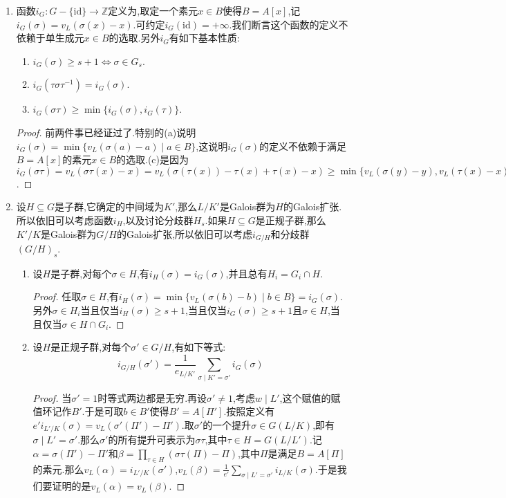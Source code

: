 \begin{enumerate}
\begin{proof}
    	验证当$s$足够大时有$G_s=\{e\}$.因为这里$L/K$是有限扩张,只要取$N=\max\{v_L(\sigma(x)-x)\}$,其中$\sigma\not=\mathrm{id}$,那么当$s\ge N$时就有每个$\sigma\not=\mathrm{id}$都不在$G_s$里.也即$G_s=\{e\}$.
    \end{proof}
    \item 函数$i_G:G-\{\mathrm{id}\}\to\mathbb{Z}$定义为,取定一个素元$x\in B$使得$B=A[x]$,记$i_G(\sigma)=v_L(\sigma(x)-x)$.可约定$i_G(\mathrm{id})=+\infty$.我们断言这个函数的定义不依赖于单生成元$x\in B$的选取.另外$i_G$有如下基本性质:
    \begin{enumerate}
    	\item $i_G(\sigma)\ge s+1\Leftrightarrow\sigma\in G_s$.
    	\item $i_G(\tau\sigma\tau^{-1})=i_G(\sigma)$.
    	\item $i_G(\sigma\tau)\ge\min\{i_G(\sigma),i_G(\tau)\}$.
    \end{enumerate}
    \begin{proof}
    	
    	前两件事已经证过了.特别的(a)说明$i_G(\sigma)=\min\{v_L(\sigma(a)-a)\mid a\in B\}$,这说明$i_G(\sigma)$的定义不依赖于满足$B=A[x]$的素元$x\in B$的选取.(c)是因为$i_G(\sigma\tau)=v_L(\sigma\tau(x)-x)=v_L(\sigma(\tau(x))-\tau(x)+\tau(x)-x)\ge\min\{v_L(\sigma(y)-y),v_L(\tau(x)-x)\}\ge\min\{i_G(\sigma),i_G(\tau)\}$.
    \end{proof}
    \item 设$H\subseteq G$是子群,它确定的中间域为$K'$,那么$L/K'$是Galois群为$H$的Galois扩张.所以依旧可以考虑函数$i_H$,以及讨论分歧群$H_s$.如果$H\subseteq G$是正规子群,那么$K'/K$是Galois群为$G/H$的Galois扩张,所以依旧可以考虑$i_{G/H}$和分歧群$(G/H)_s$.
    \begin{enumerate}
    	\item 设$H$是子群,对每个$\sigma\in H$,有$i_H(\sigma)=i_G(\sigma)$,并且总有$H_i=G_i\cap H$.
    	\begin{proof}
    		
    		任取$\sigma\in H$,有$i_H(\sigma)=\min\{v_L(\sigma(b)-b)\mid b\in B\}=i_G(\sigma)$.另外$\sigma\in H_i$当且仅当$i_H(\sigma)\ge s+1$,当且仅当$i_G(\sigma)\ge s+1$且$\sigma\in H$,当且仅当$\sigma\in H\cap G_i$.
    	\end{proof}
        \item 设$H$是正规子群,对每个$\sigma'\in G/H$,有如下等式:
        $$i_{G/H}(\sigma')=\frac{1}{e_{L/K'}}\sum\limits_{\sigma\mid K'=\sigma'}i_G(\sigma)$$
        \begin{proof}
        	
        	当$\sigma'=1$时等式两边都是无穷.再设$\sigma'\not=1$,考虑$w\mid L'$,这个赋值的赋值环记作$B'$.于是可取$b\in B'$使得$B'=A[\Pi']$.按照定义有$e'i_{L'/K}(\sigma)=v_L(\sigma'(\Pi')-\Pi')$.取$\sigma'$的一个提升$\sigma\in G(L/K)$,即有$\sigma\mid L'=\sigma'$.那么$\sigma'$的所有提升可表示为$\sigma\tau$,其中$\tau\in H=G(L/L')$.记$\alpha=\sigma(\Pi')-\Pi'$和$\beta=\prod_{\tau\in H}(\sigma\tau(\Pi)-\Pi)$,其中$\Pi$是满足$B=A[\Pi]$的素元.那么$v_L(\alpha)=i_{L'/K}(\sigma')$,$v_L(\beta)=\frac{1}{e'}\sum_{\sigma\mid L'=\sigma'}i_{L/K}(\sigma)$.于是我们要证明的是$v_L(\alpha)=v_L(\beta)$.
        	

\end{proof}
\end{enumerate}
\end{enumerate}
